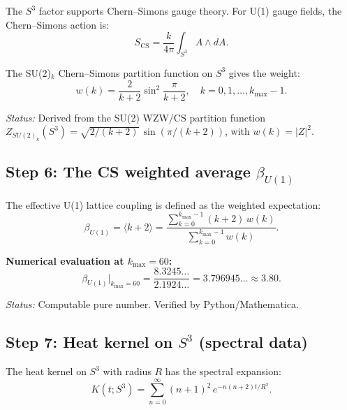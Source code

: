 \documentclass[12pt,a4paper]{article}
\begin{document}
The $S^3$ factor supports Chern--Simons gauge theory.  For U(1) gauge
fields, the Chern--Simons action is:
\begin{equation}\tag{E5a}
S_{\mathrm{CS}} = \frac{k}{4\pi}\int_{S^3} A \wedge dA.
\end{equation}

The SU(2)$_k$ Chern--Simons partition function on $S^3$ gives the weight:
\begin{equation}\tag{E5b}
w(k) = \frac{2}{k+2}\sin^2\!\frac{\pi}{k+2}, \quad k = 0, 1, \ldots, k_{\max} - 1.
\end{equation}

\textit{Status:} Derived from the SU(2) WZW/CS partition function
$Z_{SU(2)_k}(S^3) = \sqrt{2/(k+2)}\,\sin(\pi/(k+2))$, with
$w(k) = |Z|^2$.

\subsection{Step 6: The CS weighted average $\beta_{U(1)}$}

The effective U(1) lattice coupling is defined as the weighted expectation:
\begin{equation}\tag{E6a}
\beta_{U(1)} = \langle k + 2 \rangle
= \frac{\displaystyle\sum_{k=0}^{k_{\max}-1}(k+2)\,w(k)}
       {\displaystyle\sum_{k=0}^{k_{\max}-1}w(k)}.
\end{equation}

\textbf{Numerical evaluation at $k_{\max} = 60$:}
\begin{equation}\tag{E6b}
\beta_{U(1)}\big|_{k_{\max}=60} = \frac{8.3245\ldots}{2.1924\ldots} = 3.796945\ldots \approx 3.80.
\end{equation}

\textit{Status:} Computable pure number.  Verified by Python/Mathematica.

\subsection{Step 7: Heat kernel on $S^3$ (spectral data)}

The heat kernel on $S^3$ with radius $R$ has the spectral expansion:
\begin{equation}\tag{E7}
K(t; S^3) = \sum_{n=0}^{\infty}(n+1)^2\,e^{-n(n+2)t/R^2}.
\end{equation}
\end{document}
